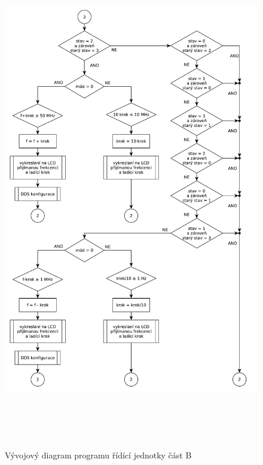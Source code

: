 \begin{figure}[H]
	\centering
	\includegraphics[height=220mm]{img/vyvojak_b.pdf}
	\caption{Vývojový diagram programu řídící jednotky část B}    		
\end{figure}


